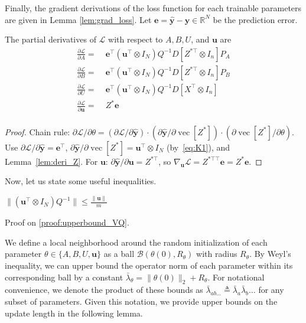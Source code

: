 \documentclass[twoside]{article}
\DeclareMathOperator{\vecop}{vec}
\newcommand{\Lc}{\mathcal{L}}
\newcommand{\ehat}{\mathbf{e}}
\newcommand{\yhat}{\hat{\mathbf{y}}}
\newcommand{\ub}{\mathbf{u}}
\begin{document}
Finally, the gradient derivations of the loss function for each trainable parameters are given in Lemma \ref{lem:grad_loss}. Let $\mathbf{e} = \hat{\mathbf{y}} - \mathbf{y} \in \mathbb{R}^N$ be the prediction error.
\begin{lemma}
\label{lem:grad_loss}
The partial derivatives of $\mathcal{L}$ with respect to $A, B, U$, and $\mathbf{u}$ are
\begin{align*}
    \frac{\partial \mathcal{L}}{\partial A} =&\;\mathbf{e}^\top \left(\mathbf{u}^\top \otimes I_N \right) Q^{-1} D\left[Z^{*\top} \otimes I_n\right] P_A \\
    \frac{\partial \mathcal{L}}{\partial B} =&\;\mathbf{e}^\top \left(\mathbf{u}^\top \otimes I_N \right) Q^{-1} D\left[Z^{*\top} \otimes I_n\right] P_B \\
    \frac{\partial \mathcal{L}}{\partial U} =&\;\mathbf{e}^\top \left(\mathbf{u}^\top \otimes I_N \right) Q^{-1} D\left[X^\top \otimes I_n\right] \\
    \frac{\partial \mathcal{L}}{\partial \mathbf{u}} =&\;Z^{*}\mathbf{e} \\
\end{align*}

\end{lemma}

\begin{proof}
Chain rule: $\partial\Lc/\partial\theta
= (\partial\Lc/\partial\yhat)\cdot(\partial\yhat/\partial\vecop[Z^*])\cdot
  (\partial\vecop[Z^*]/\partial\theta)$.
Use $\partial\Lc/\partial\yhat = \ehat^\top$,
$\partial\yhat/\partial\vecop[Z^*] = \ub^\top\otimes I_N$ (by~\eqref{eq:K1}),
and Lemma~\ref{lem:deri_Z}.
For $\ub$: $\partial\yhat/\partial\ub = Z^{*\top}$, so $\nabla_\ub\Lc = Z^{*\top\top}\ehat = Z^*\ehat$.
\end{proof}


Now, let us state some useful inequalities.

\begin{lemma}
\label{lem:upperbound_VQ}
$\| (\mathbf{u}^\top \otimes I_N) Q^{-1}\| \le \frac{\|\mathbf{u}\|}{m}$
\end{lemma}
Proof on \ref{proof:upperbound_VQ}.

We define a local neighborhood around the random initialization of each parameter $\theta \in \{A, B, U, \mathbf{u}\}$ as a ball $\mathcal{B}(\theta(0), R_\theta)$ with radius $R_\theta$. By Weyl's inequality, we can upper bound the operator norm of each parameter within its corresponding ball by a constant $\bar{\lambda}_{\theta} = \|\theta(0)\|_2 + R_{\theta}$. For notational convenience, we denote the product of these bounds as $\bar{\lambda}_{ab\dots} \triangleq \bar{\lambda}_a \bar{\lambda}_b \dots$ for any subset of parameters. Given this notation, we provide upper bounds on the update length in the following lemma.
\end{document}

